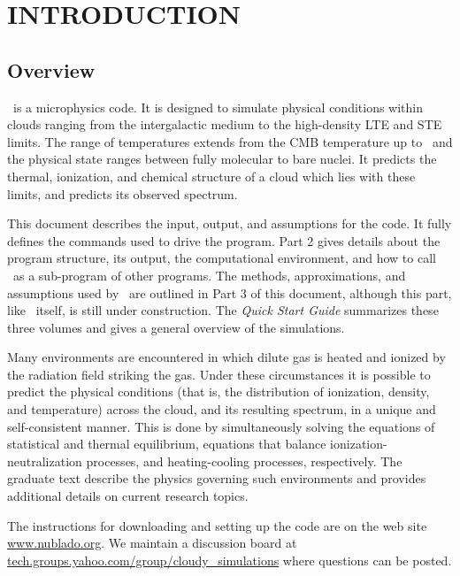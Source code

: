 \chapter{INTRODUCTION}

\section{Overview}

\noindent \Cloudy\ is a microphysics code.
It is designed to simulate physical conditions within clouds
ranging from the intergalactic
medium to the high-density LTE and STE limits.
The range of temperatures extends from the CMB temperature
up to \TempLimitHigh\ and the physical state
ranges between fully molecular to bare nuclei.
It predicts the thermal, ionization, and chemical structure
of a cloud which lies with these limits, and
predicts its observed spectrum.

This document describes the input, output,
and assumptions for the code.
It fully defines the commands used to drive the
program.
Part 2 gives details about the program
structure, its output, the computational environment, and how to call \Cloudy\
as a sub-program of other programs.
The methods, approximations, and assumptions used by \Cloudy\ are
outlined in Part 3 of this document, although this part, like \Cloudy\ itself,
is still under construction.
The \emph{Quick Start Guide} summarizes these
three volumes and gives a general overview of the simulations.

Many environments are encountered in which dilute gas is heated and
ionized by the radiation field striking the gas.  Under these
circumstances it is possible to predict the physical conditions (that
is, the distribution of ionization, density, and temperature) across
the cloud, and its resulting spectrum, in a unique and self-consistent
manner.  This is done by simultaneously solving the equations of
statistical and thermal equilibrium, equations that balance
ionization-neutralization processes, and heating-cooling processes,
respectively.  The graduate text \citet[hereafter
AGN3]{Osterbrock2006} describe the physics governing such environments
and \citet{Ferland2003} provides additional details on current
research topics.

The instructions for downloading and
setting up the code are on the web site
\href{http://www.nublado.org}{www.nublado.org}.
We maintain a discussion board at
\href{http://tech.groups.yahoo.com/group/cloudy_simulations}
{tech.groups.yahoo.com/group/cloudy\_simulations}
where questions can be posted.


